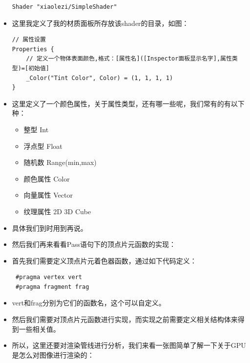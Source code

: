 \documentclass[9pt, b5paper]{article}
\begin{document}
\begin{itemize}
\begin{verbatim}
Shader "xiaolezi/SimpleShader"
\end{verbatim}
\item 这里我定义了我的材质面板所存放该shader的目录，如图：
\begin{verbatim}
// 属性设置  
Properties {  
    // 定义一个物体表面颜色,格式：[属性名]([Inspector面板显示名字],属性类型)=[初始值]  
    _Color("Tint Color", Color) = (1, 1, 1, 1)  
}
\end{verbatim}
\item 这里定义了一个颜色属性，关于属性类型，还有哪一些呢，我们常有的有以下种：
\begin{itemize}
\item 整型 Int
\item 浮点型 Float
\item 随机数 Range(min,max)
\item 颜色属性 Color
\item 向量属性 Vector
\item 纹理属性 2D 3D Cube
\end{itemize}
\item 具体我们到时用到再说。
\item 然后我们再来看看Pass语句下的顶点片元函数的实现：
\item 首先我们需要定义顶点片元着色器函数，通过如下代码定义：
\begin{verbatim}
 #pragma vertex vert  
 #pragma fragment frag
\end{verbatim}
\item vert和frag分别为它们的函数名，这个可以自定义。
\item 然后我们需要对顶点片元函数进行实现，而实现之前需要定义相关结构体来得到一些相关值。
\item 所以，这里还要对渲染管线进行分析，我们来看一张图简单了解一下关于GPU是怎么对图像进行渲染的：


\end{itemize}
\end{document}
